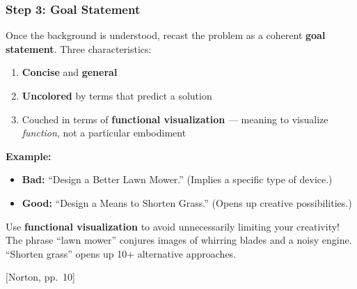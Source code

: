 \documentclass[10pt,aspectratio=43]{beamer}
\newcommand{\pref}[1]{\vfill\hfill{\scriptsize\color{gray}[Norton, pp.~#1]}}
\begin{document}
\begin{frame}
\frametitle{Step 3: Goal Statement}

Once the background is understood, recast the problem as a coherent \textbf{goal statement}. Three characteristics:
\begin{enumerate}
  \item \textbf{Concise} and \textbf{general}
  \item \textbf{Uncolored} by terms that predict a solution
  \item Couched in terms of \textbf{functional visualization} --- meaning to visualize \emph{function}, not a particular embodiment
\end{enumerate}

\vspace{6pt}
\textbf{Example:}
\begin{itemize}
  \item \textbf{Bad:} ``Design a Better Lawn Mower.'' (Implies a specific type of device.)
  \item \textbf{Good:} ``Design a Means to Shorten Grass.'' (Opens up creative possibilities.)
\end{itemize}

\vspace{4pt}
\begin{yellowbox}
Use \textbf{functional visualization} to avoid unnecessarily limiting your creativity! The phrase ``lawn mower'' conjures images of whirring blades and a noisy engine. ``Shorten grass'' opens up 10+ alternative approaches.
\end{yellowbox}
\pref{10}
\end{frame}
\end{document}
